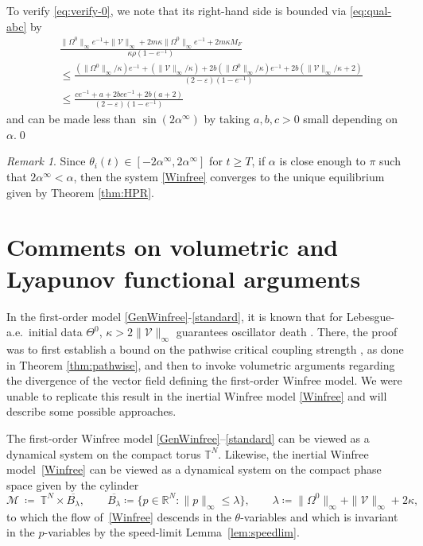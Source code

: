 \documentclass[11pt,reqno]{amsart}
\newcommand{\R}{\mathbb{R}}
\newcommand{\T}{\mathbb{T}}
\theoremstyle{definition}
\theoremstyle{remark}
\newtheorem{remark}[lemma]{Remark}
\begin{document}
To verify \eqref{eq:verify-0}, we note that its right-hand side is bounded via \eqref{eq:qual-abc} by
\begin{align*}
&\frac{\|\Omega^0\|_\infty e^{-1}+\|\mathcal V\|_\infty+2m\kappa\|\Omega^0\|_\infty e^{-1}+2m\kappa M_F}{\kappa\rho(1-e^{-1})}\\
&\le \frac{(\|\Omega^0\|_\infty/\kappa) e^{-1}+(\|\mathcal V\|_\infty/\kappa)+2b(\|\Omega^0\|_\infty/\kappa) e^{-1}+2b (\|\mathcal{V}\|_\infty/\kappa+2)}{(2-\varepsilon)(1-e^{-1})}\\
&\le \frac{c e^{-1}+a+2bc e^{-1}+2b (a+2)}{(2-\varepsilon)(1-e^{-1})}
\end{align*}
and can be made less than $\sin (2\alpha^\infty)$ by taking $a,b,c>0$ small depending on $\alpha$.\qed

\begin{remark}
Since $\theta_i(t)\in [-2\alpha^\infty,2\alpha^\infty]$ for $t\ge T$, if $\alpha$ is close enough to $\pi$ such that $2\alpha^\infty<\alpha$, then the system \eqref{Winfree} converges to the unique equilibrium given by Theorem \ref{thm:HPR}.
\end{remark}


\section{Comments on volumetric and Lyapunov functional arguments}\label{sec:volume}

In the first-order model \eqref{GenWinfree}-\eqref{standard}, it is known that for Lebesgue-a.e.~initial data $\Theta^0$, $\kappa>2\|\mathcal{V}\|_\infty$ guarantees oscillator death \cite[Theorem 1]{ryoo2026oscillator}. There, the proof was to first establish a bound on the pathwise critical coupling strength \cite[Corollary 16]{ryoo2026oscillator}, as done in Theorem \ref{thm:pathwise}, and then to invoke volumetric arguments regarding the divergence of the vector field defining the first-order Winfree model. We were unable to replicate this result in the inertial Winfree model \eqref{Winfree} and will describe some possible approaches.

The first-order Winfree model \eqref{GenWinfree}--\eqref{standard} can be viewed as a dynamical system on the compact torus $\mathbb{T}^N$. Likewise, the inertial Winfree model~\eqref{Winfree} can be viewed as a dynamical system on the compact phase space given by the
cylinder
\[
\mathcal M\ \coloneqq\ \T^N\times\overline{B_\lambda},\qquad
\overline{B_\lambda}\coloneqq\{p\in\R^N:\|p\|_\infty\le\lambda\},\qquad
\lambda\coloneqq\|\Omega^0\|_\infty+\|\mathcal V\|_\infty+2\kappa,
\]
to which the flow of~\eqref{Winfree} descends in the $\theta$-variables
and which is invariant in the $p$-variables by the speed-limit
Lemma~\ref{lem:speedlim}. 
\end{document}
